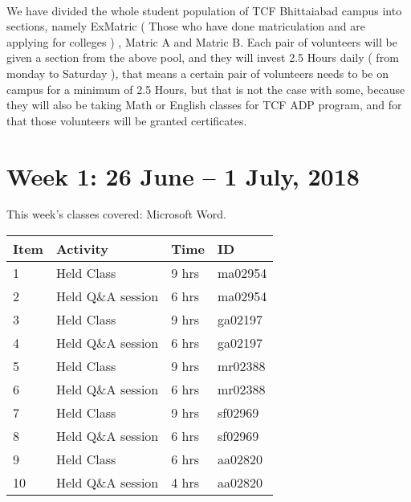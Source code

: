 \documentclass{article}
\begin{document}

\\We have divided the whole student population of TCF Bhittaiabad campus into sections, namely ExMatric ( Those who have done matriculation and are applying for colleges ) , Matric A and Matric B. Each pair of volunteers will be given a section from the above pool, and they will invest 2.5 Hours daily ( from monday to Saturday ), that means a certain pair of volunteers needs to be on campus for a minimum of 2.5 Hours, but that is not the case with some, because they will also be taking Math or English classes for TCF ADP program, and for that those volunteers will be granted certificates.

\newpage %
\section*{Week 1: 26 June -- 1 July, 2018}

This week's classes covered: Microsoft Word.\\


\begin{tabular}{|l|l|l|l|}
  \hline
  Item 	& Activity & Time & ID \\\hline\hline
  1	& Held Class & 9 hrs & ma02954 \\\hline
  2	& Held Q\&A session & 6 hrs & ma02954 \\\hline
  3	& Held Class & 9 hrs & ga02197 \\\hline
  4	& Held Q\&A session & 6 hrs & ga02197 \\\hline
  5	& Held Class & 9 hrs & mr02388  \\\hline
  6	& Held Q\&A session & 6 hrs & mr02388  \\\hline
  7	& Held Class & 9 hrs & sf02969  \\\hline
  8	& Held Q\&A session & 6 hrs & sf02969 \\\hline
  9	& Held Class & 6 hrs & aa02820 \\\hline
  10	& Held Q\&A session & 4 hrs & aa02820 \\\hline
\end{tabular}
\end{document}
